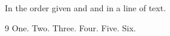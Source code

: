 \documentclass{article}
\begin{document}
In the order given \cite{c,a,b} and \cite{a,b,c,f,e,d} and \cite{d,e,f,a} in a line of text.

\begin{thebibliography}{9}
 One.
 Two.
 Three.
 Four.
 Five.
 Six.
\end{thebibliography}
\end{document}
